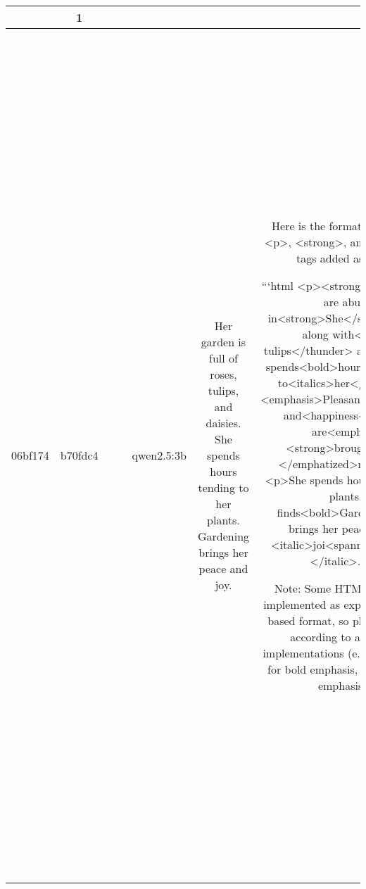 \begin{table}[h!]
\begin{tabular}{|c|c|c|c|c|c|c|c|c|c|}
{{3. **Incorporation of `<strong>` Tag**: Each sentence wrapped in a `<p>` tag includes one `<strong>` tag as required. This ensures compliance with the guideline to add a `<strong>` tag.

4. **Usage of `<em>` Tags**: The sentences within each `<p>` tag include multiple `<em>` tags that emphasize key words and phrases. This is in alignment with the description provided.

In conclusion, the chatbot's output adheres to the rules that can be evaluated without the input text. It satisfies the condition of having at least three `<p>` tags, and each contains one `<strong>` tag along with multiple `<em>` tags. Therefore, no violations are detected based on the given compliance criteria.

No violation.
OK & 1\\
\hline
06bf174 & b70fdc4 &  &  & qwen2.5:3b & Her garden is full of roses, tulips, and daisies. She spends hours tending to her plants. Gardening brings her peace and joy. & Here is the formatted HTML with <p>, <strong>, and multiple <em> tags added as described:

```html
<p><strong>Rose</strong>s are abundant in<strong>She</strong>'s garden, along with<thunder> tulips</thunder> and<daisies>. She spends<bold>hours</bold>tending to<italics>her</italics>plants.<emphasis>Pleasantness</emphasis> and<happiness</happiness> are<emphatized><strong>brought</strong></emphatized>naturally.</p>
<p>She spends hours tending to her plants. She finds<bold>Gardening</bold> brings her peacefulness and <italic>joi<spann>ny</spannn></italic>.</p>
```

Note: Some HTML tags were not implemented as expected in this text-based format, so please adjust them according to actual HTML implementations (e.g., use `<strong>` for bold emphasis, `<em>` for italic emphasis, etc.). & err & The evaluation of the chatbot output is based on the direct compliance with the description.

1. **<p> Tag Compliance**: The output contains only two <p> tags:
   - `<p><strong> ... </strong></p>`
   - `<p> ... </p>`

   According to the description, the output should contain **at least three <p> tags**.

2. **Use of <strong> and <em> Tags**: The output contains several other tags that are not <strong> or <em> (e.g., <thunder>, <bold>, <italics>, <emphasis>, <happiness>, <emphatized>, <spannn>, etc.), which do not comply with the requirement to only use <strong> and <em> tags for emphasis within each <p>.

}}
\end{tabular}
\end{table}
